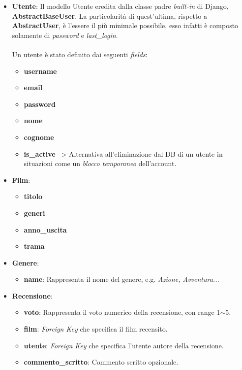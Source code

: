 \documentclass[12pt]{article}
\begin{document}
	\begin{itemize}
		\item \textbf{Utente}: Il modello Utente eredita dalla classe padre \textit{built-in} di Django, \textbf{AbstractBaseUser}. La particolarità di quest'ultima, rispetto a \textbf{AbstractUser}, è l'essere il più minimale possibile, esso infatti è composto solamente di \textit{password} e \textit{last\_login}.\\ \\
		Un utente è stato definito dai seguenti \textit{fields}:
		\begin{itemize}
			\item \textbf{username}
			\item \textbf{email}
			\item \textbf{password}
			\item \textbf{nome}
			\item \textbf{cognome}
			\item \textbf{is\_active} --> Alternativa all'eliminazione dal DB di un utente in situazioni come un \textit{blocco temporaneo} dell'account. \\
		\end{itemize}
		
		\item \textbf{Film}:
		\begin{itemize}
			\item \textbf{titolo}
			\item \textbf{generi}
			\item \textbf{anno\_uscita}
			\item \textbf{trama} \\
		\end{itemize}
		
		
		\item \textbf{Genere}:
		\begin{itemize}
			\item \textbf{name}: Rappresenta il nome del genere, e.g. \textit{Azione, Avventura...} \\
		\end{itemize}
		
		
		
		\item \textbf{Recensione}:
		\begin{itemize}
			\item \textbf{voto}: Rappresenta il voto numerico della recensione, con range 1$\sim$5.
			\item \textbf{film}: \textit{Foreign Key} che specifica il film recensito.
			\item \textbf{utente}: \textit{Foreign Key} che specifica l'utente autore della recensione.
			\item \textbf{commento\_scritto}: Commento scritto opzionale.
		\end{itemize}
	\end{itemize}
\end{document}
